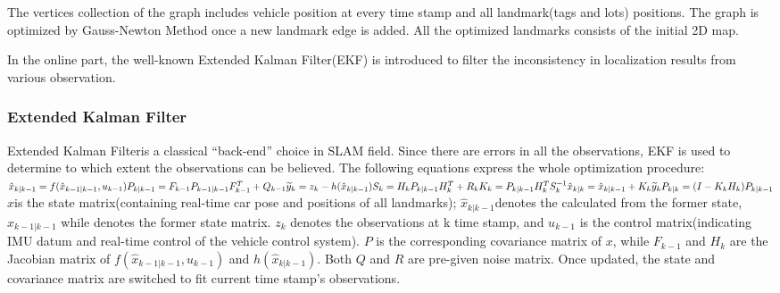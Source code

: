 \documentclass[journal]{IEEEtran}
\begin{document}
The vertices collection of the graph includes vehicle position at every time stamp and all landmark(tags and lots) positions. 
The graph is optimized by Gauss-Newton Method once a new landmark edge is added. All the optimized landmarks consists of the initial 2D map.

In the online part, the well-known Extended Kalman Filter(EKF)\cite{Bailey2006Simultaneous} is introduced to filter the inconsistency in localization results from various observation. 

\subsubsection{Extended Kalman Filter}
Extended Kalman Filter\cite{Bailey2006Simultaneous}is a classical “back-end” choice in SLAM field. 
Since there are errors in all the observations, EKF is used to determine to which extent the observations can be believed. 
The following equations express the whole optimization procedure:
$
{\hat x}_{k|k-1}=f({\hat x}_{k-1|k-1},{u}_{k-1})\\
{P}_{k|k-1} = {F}_{k-1}{P}_{k-1|k-1}{F}_{k-1}^{T}+{Q}_{k-1}\\
\\
{\widetilde y}_{k}={z}_{k}-h({\hat x}_{k|k-1})\\
{S}_{k}={H}_{k}{P}_{k|k-1}{H}_{k}^{T}+{R}_{k}\\
{K}_{k}={P}_{k|k-1}{H}_{k}^{T}{S}_{k}^{-1}\\
{\hat x}_{k|k}={\hat x}_{k|k-1}+{K}_{k}{\widetilde y}_{k}\\
{P}_{k|k}=(I-{K}_{k}{H}_{k}){P}_{k|k-1}\\
$
\\
 $x$is the state matrix(containing real-time car pose and positions of all landmarks);  
 ${\hat x}_{k|k-1}$denotes the  calculated from the former state, ${\hat x}_{k-1|k-1}$ while denotes the former state matrix.  
 $z_k$ denotes the observations at k time stamp, 
 and $u_{k-1}$ is the control matrix(indicating IMU datum and real-time control of the vehicle control system). 
 $P$ is the corresponding covariance matrix of $x$, while $F_{k-1}$ and $H_k$ are the Jacobian matrix of $f({\hat x}_{k-1|k-1},{u}_{k-1})$ and $h({\hat x}_{k|k-1})$. 
 Both $Q$ and $R$ are pre-given noise matrix. Once updated, the state and covariance matrix are switched to fit current time stamp’s observations.
\end{document}
